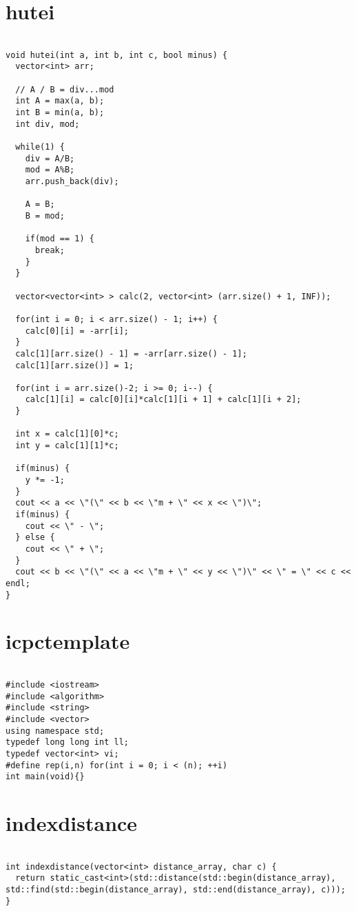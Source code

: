 \documentclass{jsarticle}
\begin{document}
\section{hutei}
\color{black}
\begin{lstlisting}[caption=hutei]

void hutei(int a, int b, int c, bool minus) {
  vector<int> arr;

  // A / B = div...mod
  int A = max(a, b);
  int B = min(a, b);
  int div, mod;

  while(1) {
    div = A/B;
    mod = A%B;
    arr.push_back(div);

    A = B;
    B = mod;

    if(mod == 1) {
      break;
    }
  }

  vector<vector<int> > calc(2, vector<int> (arr.size() + 1, INF));

  for(int i = 0; i < arr.size() - 1; i++) {
    calc[0][i] = -arr[i];
  }
  calc[1][arr.size() - 1] = -arr[arr.size() - 1];
  calc[1][arr.size()] = 1;

  for(int i = arr.size()-2; i >= 0; i--) {
    calc[1][i] = calc[0][i]*calc[1][i + 1] + calc[1][i + 2];
  }

  int x = calc[1][0]*c;
  int y = calc[1][1]*c;

  if(minus) {
    y *= -1;
  }
  cout << a << \"(\" << b << \"m + \" << x << \")\";
  if(minus) {
    cout << \" - \";
  } else {
    cout << \" + \";
  }
  cout << b << \"(\" << a << \"m + \" << y << \")\" << \" = \" << c << endl;
}

\end{lstlisting}

\color{white}
\section{icpctemplate}
\color{black}
\begin{lstlisting}[caption=icpctemplate]

#include <iostream>
#include <algorithm>
#include <string>
#include <vector>
using namespace std;
typedef long long int ll;
typedef vector<int> vi;
#define rep(i,n) for(int i = 0; i < (n); ++i)
int main(void){}

\end{lstlisting}

\color{white}
\section{indexdistance}
\color{black}
\begin{lstlisting}[caption=indexdistance]

int indexdistance(vector<int> distance_array, char c) {
  return static_cast<int>(std::distance(std::begin(distance_array), std::find(std::begin(distance_array), std::end(distance_array), c)));
}

\end{lstlisting}
\end{document}
